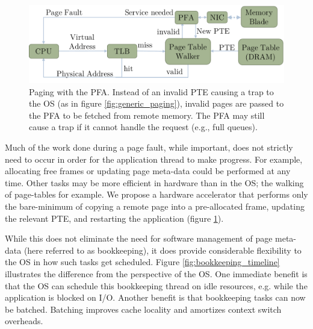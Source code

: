 \begin{figure}[h]
    \centering
    \includegraphics[width=0.9\columnwidth]{figs/generic_pfa.pdf}
    \vspace{-5mm}
    \caption{Paging with the PFA. Instead of an invalid PTE causing a trap to the OS (as in figure \ref{fig:generic_paging}), invalid pages are passed to the PFA to be fetched from remote memory. The PFA may still cause a trap if it cannot handle the request (e.g., full queues).}
    \label{fig:pfa_generic}
\end{figure}

Much of the work done during a page fault, while important, does not strictly
need to occur in order for the application thread to make progress. For
example, allocating free frames or updating page meta-data could be performed at
any time. Other tasks may be more efficient in hardware than in the OS; the
walking of page-tables for example. We propose a hardware accelerator that
performs only the bare-minimum of copying a remote page into a pre-allocated
frame, updating the relevant PTE, and restarting the application (figure
\ref{fig:pfa_generic}).

While this does not eliminate the need for software management of page meta-data
(here referred to as \gls{bookkeeping}), it does provide considerable flexibility
to the OS in how such \glspl{task} get scheduled. Figure
\ref{fig:bookkeeping_timeline} illustrates the difference from the perspective
of the OS. One immediate benefit is that the OS can schedule this bookkeeping
thread on idle resources, e.g. while the application is blocked on I/O.
Another benefit is that bookkeeping tasks can now be batched. Batching improves
cache locality and amortizes context switch overheads. 

